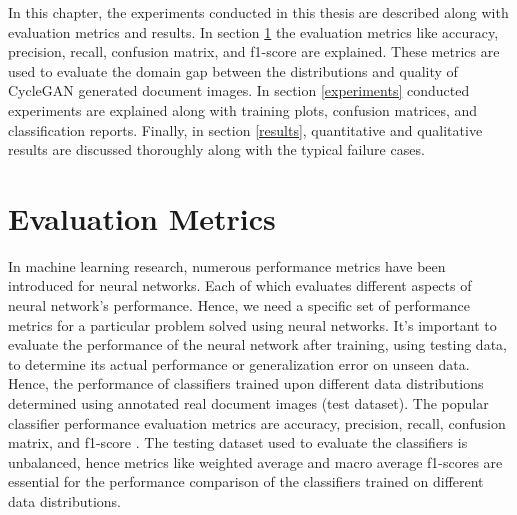 \justifying
\setlength{\parskip}{1em}

In this chapter, the experiments conducted in this thesis are described along with evaluation metrics and results. In section \ref{EvaluationMetrics} the evaluation metrics like accuracy, precision, recall, confusion matrix, and f1-score are explained. These metrics are used to evaluate the domain gap between the distributions and quality of \ac{CycleGAN} generated document images. In section \ref{experiments} conducted experiments are explained along with training plots, confusion matrices, and classification reports. Finally, in section \ref{results}, quantitative and qualitative results are discussed thoroughly along with the typical failure cases.

\section{Evaluation Metrics}\label{EvaluationMetrics}


In machine learning research, numerous performance metrics have been introduced for neural networks. Each of which evaluates different aspects of neural network's performance. Hence, we need a specific set of performance metrics for a particular problem solved using neural networks. It's important to evaluate the performance of the neural network after training, using testing data, to determine its actual performance or generalization error on unseen data. Hence, the performance of classifiers trained upon different data distributions determined using annotated real document images (test dataset). The popular classifier performance evaluation metrics are accuracy, precision, recall, confusion matrix, and f1-score \cite{powers2020evaluation}. The testing dataset used to evaluate the classifiers is unbalanced, hence metrics like weighted average and macro average f1-scores are essential for the performance comparison of the classifiers trained on different data distributions. 

